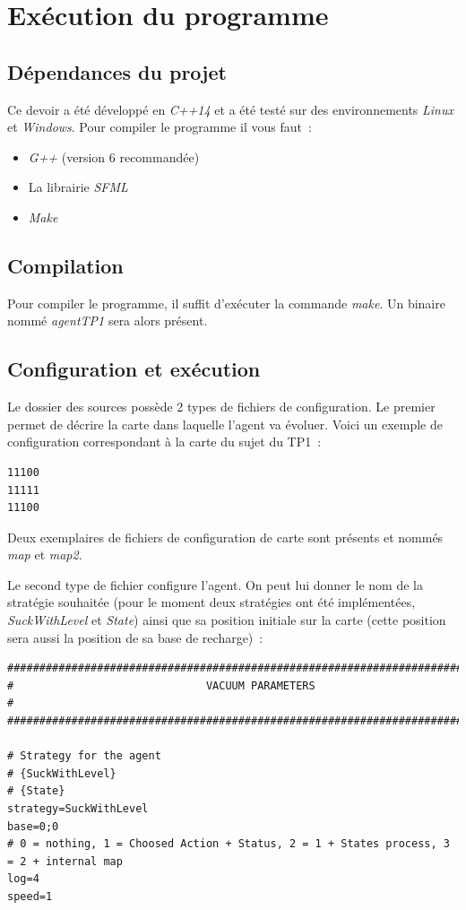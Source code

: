 \documentclass{article}
\begin{document}
\section{Exécution du programme}
\subsection{Dépendances du projet}
Ce devoir a été développé en \emph{C++14} et a été testé sur des environnements
\emph{Linux} et \emph{Windows}. Pour compiler le
programme il vous faut~:
\begin{itemize}
    \item \emph{G++} (version 6 recommandée)
    \item La librairie \emph{SFML}
    \item \emph{Make}
\end{itemize}
\subsection{Compilation}
Pour compiler le programme, il suffit d'exécuter la commande \emph{make}. Un
binaire nommé \emph{agentTP1} sera alors présent.
\subsection{Configuration et exécution}
Le dossier des sources possède 2 types de fichiers de configuration. Le premier
permet de décrire la carte dans laquelle l'agent va évoluer. Voici un exemple de
configuration correspondant à la carte du sujet du TP1~:
\begin{verbatim}
11100
11111
11100
\end{verbatim}
Deux exemplaires de fichiers de configuration de carte sont présents et nommés
\emph{map} et \emph{map2}.

Le second type de fichier configure l'agent. On peut lui donner le nom de la
stratégie souhaitée (pour le moment deux stratégies ont été implémentées,
\emph{SuckWithLevel} et \emph{State}) ainsi que sa position initiale sur la
carte (cette position sera aussi la position de sa base de recharge)~:

\begin{verbatim}
###############################################################################
#                              VACUUM PARAMETERS                              #
###############################################################################

# Strategy for the agent
# {SuckWithLevel}
# {State}
strategy=SuckWithLevel
base=0;0
# 0 = nothing, 1 = Choosed Action + Status, 2 = 1 + States process, 3 = 2 + internal map
log=4
speed=1
\end{verbatim}
\end{document}
